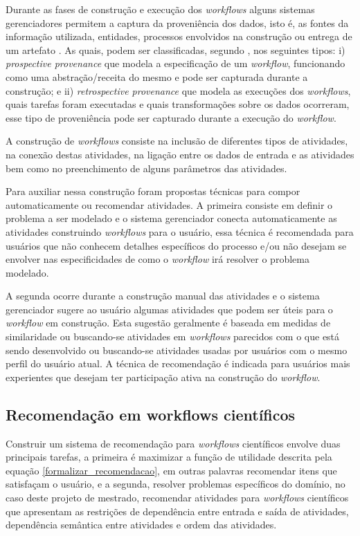 \documentclass{acm_proc_article-sp}
\begin{document}
Durante as fases de constru\c{c}{\~a}o e execu\c{c}{\~a}o dos \emph{workflows} alguns sistemas gerenciadores permitem a captura da proveni{\^e}ncia dos dados, isto {\'e}, as fontes da informa\c{c}{\~a}o utilizada, entidades, processos envolvidos na constru\c{c}{\~a}o ou entrega de um artefato \cite{Zeng2011}. As quais, podem ser classificadas, segundo \cite{Lim2010}, nos seguintes tipos: i) \emph{prospective provenance} que modela a especifica\c{c}{\~a}o de um \emph{workflow}, funcionando como uma abstra\c{c}{\~a}o/receita do mesmo e pode ser capturada durante a constru\c{c}{\~a}o; e ii) \emph{retrospective provenance} que modela as execu\c{c}{\~o}es dos \emph{workflows}, quais tarefas foram executadas e quais transforma\c{c}{\~o}es sobre os dados ocorreram, esse tipo de proveni{\^e}ncia pode ser capturado durante a execu\c{c}{\~a}o do \emph{workflow}.

A constru\c{c}{\~a}o de \emph{workflows} consiste na inclus{\~a}o de diferentes tipos de atividades, na conex{\~a}o destas atividades, na liga\c{c}{\~a}o entre os dados de entrada e as atividades bem como no preenchimento de alguns par{\^a}metros das atividades.

Para auxiliar nessa constru\c{c}{\~a}o foram propostas t{\'e}cnicas para compor automaticamente ou recomendar atividades. A primeira consiste em definir o problema a ser modelado e o sistema gerenciador conecta automaticamente as atividades construindo \emph{workflows} para o usu{\'a}rio, essa t{\'e}cnica {\'e} recomendada para usu{\'a}rios que n{\~a}o conhecem detalhes espec{\'i}ficos do processo e/ou n{\~a}o desejam se envolver nas especificidades de como o \emph{workflow} ir{\'a} resolver o problema modelado. 

A segunda ocorre durante a constru\c{c}{\~a}o manual das atividades e o sistema gerenciador sugere ao usu{\'a}rio algumas atividades que podem ser {\'u}teis para o \emph{workflow} em constru\c{c}{\~a}o. Esta sugest{\~a}o geralmente {\'e} baseada em medidas de similaridade ou buscando-se atividades em \emph{workflows} parecidos com o que est{\'a} sendo desenvolvido ou buscando-se atividades usadas por usu{\'a}rios com o mesmo perfil do usu{\'a}rio atual. A t{\'e}cnica de recomenda\c{c}{\~a}o {\'e} indicada para usu{\'a}rios mais experientes que desejam ter participa\c{c}{\~a}o ativa na constru\c{c}{\~a}o do \emph{workflow}.

\subsection{Recomenda\c{c}{\~a}o em workflows cient{\'i}ficos}\label{RECOMENDACAO_WORKFLOWS_CIENTIFICOS}
Construir um sistema de recomenda\c{c}{\~a}o para \emph{workflows} cient{\'i}ficos envolve duas principais tarefas, a primeira {\'e} maximizar a fun\c{c}{\~a}o de utilidade descrita pela equa\c{c}{\~a}o \eqref{formalizar_recomendacao}, em outras palavras recomendar itens que satisfa\c{c}am o usu{\'a}rio, e a segunda, resolver problemas espec{\'i}ficos do dom{\'i}nio, no caso deste projeto de mestrado, recomendar atividades para \emph{workflows} cient{\'i}ficos que apresentam as restri\c{c}{\~o}es de depend{\^e}ncia entre entrada e sa{\'i}da de atividades, depend{\^e}ncia sem{\^a}ntica entre atividades e ordem das atividades.
\end{document}
